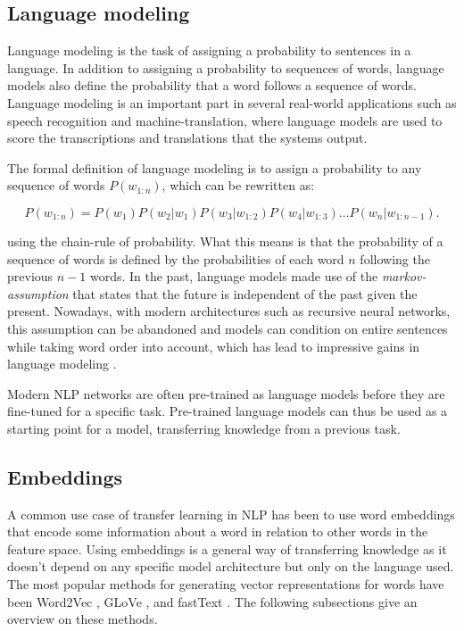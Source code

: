 \subsection{Language modeling}\label{Language modeling}
Language modeling is the task of assigning a probability to sentences in a language.
In addition to assigning a probability to sequences of words, language models also define the probability that a word follows a sequence of words.
Language modeling is an important part in several real-world applications such as speech recognition and machine-translation, where language models are used to score the transcriptions and translations that the systems output.

The formal definition of language modeling is to assign a probability to any sequence of words $P(w_{1:n})$, which can be rewritten as:

\begin{equation}
  P(w_{1:n})=P(w_1)P(w_2|w_1)P(w_3|w_{1:2})P(w_4|w_{1:3})\ldots{}P(w_n|w_{1:n-1}).
\end{equation}

using the chain-rule of probability.
What this means is that the probability of a sequence of words is defined by the probabilities of each word $n$ following the previous $n-1$ words.
In the past, language models made use of the \textit{markov-assumption} that states that the future is independent of the past given the present.
Nowadays, with modern architectures such as recursive neural networks, this assumption can be abandoned and models can condition on entire sentences while taking word order into account, which has lead to impressive gains in language modeling \cite{goldberg2017}.

Modern NLP networks are often pre-trained as language models before they are fine-tuned for a specific task.
Pre-trained language models can thus be used as a starting point for a model, transferring knowledge from a previous task.

\subsection{Embeddings} \label{Embeddings}
A common use case of transfer learning in NLP has been to use word embeddings that encode some information about a word in relation to other words in the feature space.
Using embeddings is a general way of transferring knowledge as it doesn't depend on any specific model architecture but only on the language used.
The most popular methods for generating vector representations for words have been Word2Vec \cite{mikolov2013}, GLoVe \cite{pennington2014}, and fastText \cite{bojanowski2017}.
The following subsections give an overview on these methods.

